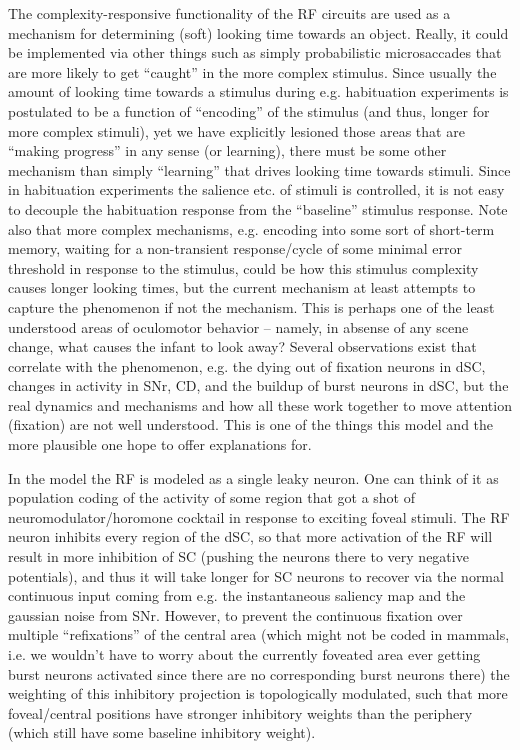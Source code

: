 \documentclass[conference]{IEEEtran}
\begin{document}
The complexity-responsive functionality of the RF circuits are used as
a mechanism for determining (soft) looking time towards an
object. Really, it could be implemented via other things such as
simply probabilistic microsaccades that are more likely to get
``caught'' in the more complex stimulus. Since usually the amount of
looking time towards a stimulus during e.g. habituation experiments is
postulated to be a function of ``encoding'' of the stimulus (and thus,
longer for more complex stimuli), yet we have explicitly lesioned
those areas that are ``making progress'' in any sense (or learning),
there must be some other mechanism than simply ``learning'' that
drives looking time towards stimuli. Since in habituation experiments
the salience etc. of stimuli is controlled, it is not easy to decouple
the habituation response from the ``baseline'' stimulus response. Note
also that more complex mechanisms, e.g. encoding into some sort of
short-term memory, waiting for a non-transient response/cycle of some
minimal error threshold in response to the stimulus, could be how this
stimulus complexity causes longer looking times, but the current
mechanism at least attempts to capture the phenomenon if not the
mechanism. This is perhaps one of the least understood areas of
oculomotor behavior -- namely, in absense of any scene change, what
causes the infant to look away? Several observations exist that
correlate with the phenomenon, e.g. the dying out of fixation neurons
in dSC, changes in activity in SNr, CD, and the buildup of burst
neurons in dSC, but the real dynamics and mechanisms and how all these
work together to move attention (fixation) are not well
understood. This is one of the things this model and the more
plausible one hope to offer explanations for.

In the model the RF is modeled as a single leaky neuron. One can think
of it as population coding of the activity of some region that got a
shot of neuromodulator/horomone cocktail in response to exciting
foveal stimuli. The RF neuron inhibits every region of the dSC, so
that more activation of the RF will result in more inhibition of SC
(pushing the neurons there to very negative potentials), and thus it
will take longer for SC neurons to recover via the normal continuous
input coming from e.g. the instantaneous saliency map and the gaussian
noise from SNr. However, to prevent the continuous fixation over
multiple ``refixations'' of the central area (which might not be coded
in mammals, i.e. we wouldn't have to worry about the currently
foveated area ever getting burst neurons activated since there are no
corresponding burst neurons there) the weighting of this inhibitory
projection is topologically modulated, such that more foveal/central
positions have stronger inhibitory weights than the periphery (which
still have some baseline inhibitory weight).
\end{document}
